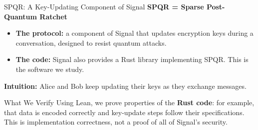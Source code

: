 \documentclass[aspectratio=169,xcolor=dvipsnames]{beamer}
\begin{document}
\begin{frame}{SPQR: A Key-Updating Component of Signal}
    \small
    \textbf{SPQR = Sparse Post-Quantum Ratchet}
    \begin{itemize}
        \item \textbf{The protocol:} a component of Signal that updates encryption keys during a conversation, designed to resist quantum attacks.
        \item \textbf{The code:} Signal also provides a Rust library implementing SPQR. This is the software we study.
    \end{itemize}
    \medskip
    \textbf{Intuition:} Alice and Bob keep updating their keys as they exchange messages.
    \begin{block}{What We Verify}
        Using Lean, we prove properties of the \textbf{Rust code}: for example,
        that data is encoded correctly and key-update steps follow their specifications.
        This is implementation correctness, not a proof of all of Signal's security.
    \end{block}
\end{frame}
\end{document}
